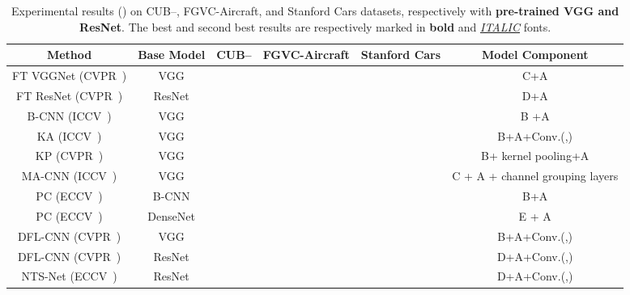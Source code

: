 \documentclass[journal]{IEEEtran}
\begin{document}
\begin{table*}[!t]
  \centering
  \footnotesize
  \caption{Experimental results () on CUB--, FGVC-Aircraft, and Stanford Cars datasets, respectively with \textbf{pre-trained VGG and ResNet}. The best and second best results are respectively marked in \textbf{bold} and \underline{\emph{ITALIC}} fonts.}
    \begin{tabular}{|c|c|c|c|c|c|}
    \hline
    Method                                       & Base Model     & CUB--              & FGVC-Aircraft                 & Stanford Cars    & Model Component \\
    \hline
    \hline
    FT VGGNet (CVPR~\cite{wang2018learning}) & VGG                    &                         &                         &             & C+A \\
    FT ResNet (CVPR~\cite{wang2018learning}) & ResNet                 &                         &                         &             & D+A \\
    B-CNN (ICCV~\cite{lin2015bilinear})      & VGG                    &                         &                         &             & B +A \\
    KA (ICCV~\cite{cai2017higher})           & VGG                    &                         &                         &             & B+A+Conv.(,) \\
    KP (CVPR~\cite{cui2017kernel})           & VGG                    &                         &                         &             & B+ kernel pooling+A \\
    MA-CNN (ICCV~\cite{zheng2017learning})   & VGG                    &                         &                         &             & C + A + channel grouping layers \\
    PC (ECCV~\cite{dubey2018pairwise})       & B-CNN                      &                         &                         &             & B+A \\
    PC (ECCV~\cite{dubey2018pairwise})       & DenseNet              &                         &                         &             & E + A \\
    DFL-CNN (CVPR~\cite{wang2018learning})   & VGG                    &                         &                         &             & B+A+Conv.(,) \\
    DFL-CNN (CVPR~\cite{wang2018learning})   & ResNet                 &                         &                         &             & D+A+Conv.(,) \\
    NTS-Net (ECCV~\cite{yang2018learning})   & ResNet                 &                         &                         &    & D+A+Conv.(,) \\

\end{tabular}
\end{table*}
\end{document}
